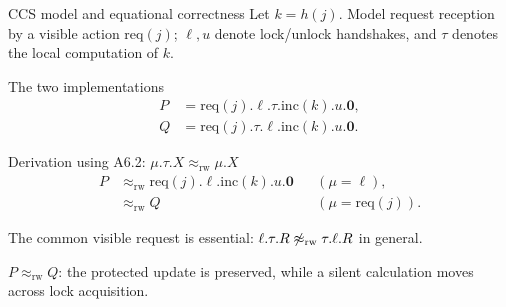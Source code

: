 \documentclass[handout,aspectratio=169,11pt]{beamer}
\newcommand{\rwb}{\mathrel{\approx_{\mathrm{rw}}}}
\newcommand{\nil}{\mathbf 0}
\newcommand{\Takeaway}[1]{\begin{exampleblock}{}#1\end{exampleblock}}
\begin{document}
\begin{frame}{CCS model and equational correctness}
  \small
  Let $k=h(j)$. Model request reception by a visible action
  $\mathrm{req}(j)$; $\ell,u$ denote lock/unlock handshakes,
  and $\tau$ denotes the local computation of $k$.
  \begin{block}{The two implementations}
    \vspace{-2mm}
    \[
      \begin{aligned}
        P &= \mathrm{req}(j).\ell.\tau.\mathrm{inc}(k).u.\nil,\\[1mm]
        Q &= \mathrm{req}(j).\tau.\ell.\mathrm{inc}(k).u.\nil.
      \end{aligned}
    \]
    \vspace{-2mm}
  \end{block}
  \begin{exampleblock}{Derivation using A6.2: $\mu.\tau.X\rwb\mu.X$}
    \vspace{-2mm}
    \[
      \begin{aligned}
        P &\rwb \mathrm{req}(j).\ell.\mathrm{inc}(k).u.\nil
          &&(\mu=\ell),\\[1mm]
          &\rwb Q
          &&(\mu=\mathrm{req}(j)).
      \end{aligned}
    \]
    \vspace{-2mm}
  \end{exampleblock}
  {\footnotesize\color{Warn}
    The common visible request is essential:
    $\ell.\tau.R\not\rwb\tau.\ell.R$ in general.\par}
  \vspace{2mm}
  \Takeaway{$\boxed{P\rwb Q}$: the protected update is preserved,
    while a silent calculation moves across lock acquisition.}
\end{frame}
\end{document}
